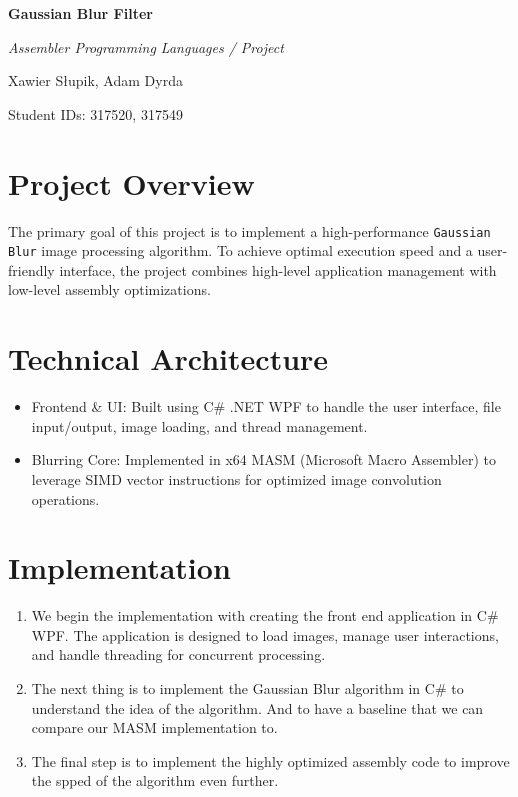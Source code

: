 \documentclass[12pt,a4paper]{article}
\begin{document}
\begin{titlepage}
    \centering
    \vspace*{2cm}
    {\huge\bfseries Gaussian Blur Filter\par}
    \vspace{1.5cm}
    {\Large\itshape{ Assembler Programming Languages / Project} \par}
    \vspace{2cm}
    {\Large Xawier Słupik, Adam Dyrda\par}
    {\large Student IDs: 317520, 317549\par}
    \vfill
\end{titlepage}

\section{Project Overview}
The primary goal of this project is to implement a high-performance \texttt{Gaussian Blur} image processing algorithm. To achieve optimal execution speed and a user-friendly interface, the project combines high-level application management with low-level assembly optimizations.
\section{Technical Architecture}
\begin{itemize}
    \item Frontend \& UI: Built using C\# .NET WPF to handle the user interface, file input/output, image loading, and thread management.
    \item Blurring Core: Implemented in x64 MASM (Microsoft Macro Assembler) to leverage SIMD vector instructions for optimized image convolution operations.
\end{itemize}

\section{Implementation}
\begin{enumerate}[label=\alph*)]
   \item We begin the implementation with creating the front end application in C\# WPF. The application is designed to load images, manage user interactions, and handle threading for concurrent processing. 
   \item The next thing is to implement the Gaussian Blur algorithm in C\# to understand the idea of the algorithm. And to have a baseline that we can compare our MASM implementation to.
   \item The final step is to implement the highly optimized assembly code to improve the spped of the algorithm even further. 
\end{enumerate}
\end{document}
